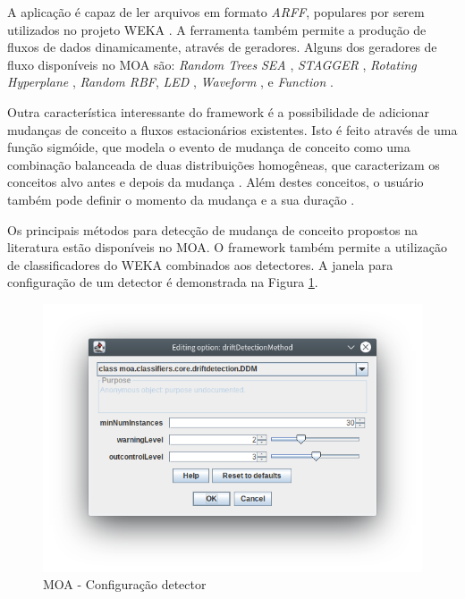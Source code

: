 \documentclass[qual, classic, a4paper]{ufbathesis}
\begin{document}
A aplicação é capaz de ler arquivos em formato \textit{ARFF}, populares por serem utilizados no projeto WEKA \cite{Hall:2009:WDM:1656274.1656278}.
A ferramenta também permite a produção de fluxos de dados dinamicamente, através de geradores.
Alguns dos geradores de fluxo disponíveis no MOA são:
\textit{Random Trees} \cite{Domingos:2000:MHD:347090.347107}
\textit{SEA} \cite{Street:2001:SEA:502512.502568}, 
\textit{STAGGER} \cite{Schlimmer1986}, 
\textit{Rotating Hyperplane} \cite{Wang:2003:MCD:956750.956778},
\textit{Random RBF}, 
\textit{LED} \cite{Gama:2003:ADT:956750.956813}, 
\textit{Waveform} \cite{Gama:2003:ADT:956750.956813}, 
 e \textit{Function} \cite{Jin:2003:EDT:956750.956821}.

Outra característica interessante do framework é a possibilidade de adicionar mudanças de conceito a fluxos estacionários existentes.
Isto é feito através de uma função sigmóide, que modela o evento de mudança de conceito como uma combinação balanceada de duas distribuições homogêneas, 
que caracterizam os conceitos alvo antes e depois da mudança \cite{bifet2009data}.
Além destes conceitos, o usuário também pode definir o momento da mudança e a sua duração \cite{Bifet:2010:MMO:1756006.1859903}.

Os principais métodos para detecção de mudança de conceito propostos na literatura estão disponíveis no MOA.
O framework também permite a utilização de classificadores do WEKA \cite{Hall:2009:WDM:1656274.1656278} combinados aos detectores.
A janela para configuração de um detector é demonstrada na Figura \ref{fig:moa_detector}.

\begin{figure}[H]
\begin{center}
    \includegraphics[scale=1]{imagens/detector.png}
    \caption{MOA - Configuração detector}
    \label{fig:moa_detector}
\end{center}
\end{figure}
\end{document}
